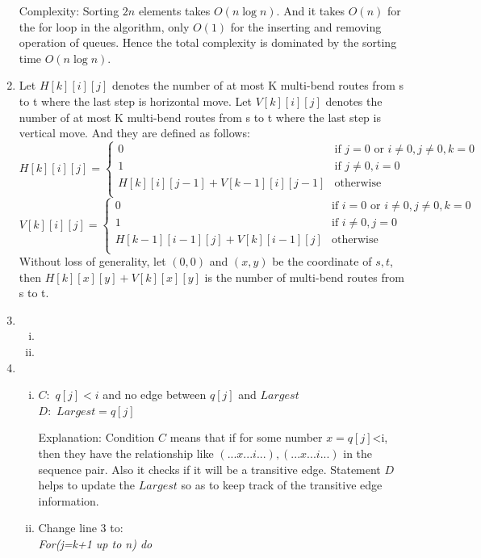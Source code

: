 \documentclass[a4paper,12pt]{article}
\begin{document}
\begin{enumerate}
Complexity: Sorting $2n$ elements takes $O(n\log n)$. 
And it takes $O(n)$ for the for loop in the algorithm, only $O(1)$ for the inserting and removing operation of queues.
Hence the total complexity is dominated by the sorting time $O(n\log n)$.
\item
Let $H[k][i][j]$ denotes the number of at most K multi-bend routes from s to t where the last step is horizontal move.
Let $V[k][i][j]$ denotes the number of at most K multi-bend routes from s to t where the last step is vertical move.
And they are defined as follows:
\begin{equation}
H[k][i][j] = \left\{ \begin{array}{ll}
			0	&	\textrm{if $j=0$ or $i\neq0,j\neq0,k=0$}\\
			1	&	\textrm{if $j\neq 0,i=0 $}\\
			H[k][i][j-1] + V[k-1][i][j-1]&	\textrm{otherwise}\\
                    \end{array}\right.
\end{equation}
\begin{equation}
V[k][i][j] = \left\{ \begin{array}{ll}
			0	&	\textrm{if $i=0$ or $i\neq0,j\neq0,k=0$}\\
			1	&	\textrm{if $i\neq 0,j=0 $}\\
			H[k-1][i-1][j] + V[k][i-1][j] &	\textrm{otherwise}\\
                    \end{array}\right.
\end{equation}
Without loss of generality, let $(0,0)$ and $(x,y)$ be the coordinate of $s,t$, 
then $H[k][x][y]+V[k][x][y]$ is the number of multi-bend routes from s to t.
\item
\begin{enumerate}[(i)]
\item
\item
\end{enumerate}
\item
\begin{enumerate}[(i)]
\item
$C:$ $q[j]<i$ and no edge between $q[j]$ and $Largest$\\
$D:$ $Largest=q[j]$

Explanation: Condition $C$ means that if for some number $x=q[j]$<i, 
then they have the relationship like $(...x...i...),(...x...i...)$ in the sequence pair.
Also it checks if it will be a transitive edge.
Statement $D$ helps to update the $Largest$ so as to keep track of the transitive edge information.
\item
Change line 3 to:\\
\textit{For(j=k+1 up to n) do}


\end{enumerate}
\end{enumerate}
\end{document}
